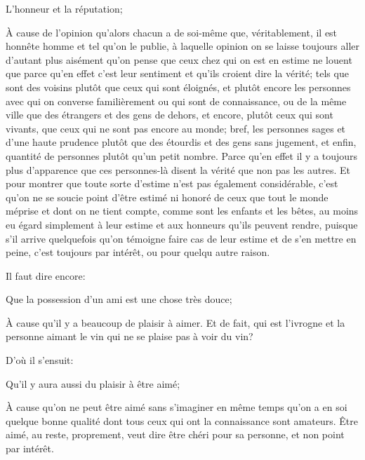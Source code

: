 \begin{lieu}
	L'honneur et la réputation;
\end{lieu}

À cause de l'opinion qu'alors chacun a de soi-même que, véritablement, il est honnête homme et tel qu'on le
publie, à laquelle opinion on se laisse toujours aller d'autant plus aisément qu'on pense que ceux chez qui
on est en estime ne louent que parce qu'en effet c'est leur sentiment et qu'ils croient dire la vérité; tels
que sont des voisins plutôt que ceux qui sont éloignés, et plutôt encore les personnes avec qui on converse
familièrement ou qui sont de connaissance, ou de la même ville que des étrangers et des gens de dehors, et
encore, plutôt ceux qui sont vivants, que ceux qui ne sont pas encore au monde; bref, les personnes sages et
d'une haute prudence plutôt que des étourdis et des gens sans jugement, et enfin, quantité de personnes
plutôt qu'un petit nombre. Parce qu'en effet il y a toujours plus d'apparence que ces personnes-là disent la
vérité que non pas les autres. Et pour montrer que toute sorte d'estime n'est pas également considérable, c'est
qu'on ne se soucie point d'être estimé ni honoré de ceux que tout le monde méprise et dont on ne tient compte,
comme sont les enfants et les bêtes, au moins eu égard simplement à leur estime et aux honneurs qu'ils peuvent
rendre, puisque s'il arrive quelquefois qu'on témoigne faire cas de leur estime et de s'en mettre en peine,
c'est toujours par intérêt, ou pour quelqu autre raison.

\bigbreak

Il faut dire encore:

\begin{lieu}
	Que la possession d'un ami est une chose très douce;
\end{lieu}

À cause qu'il y a beaucoup de plaisir à aimer. Et de fait, qui est l'ivrogne et la personne aimant le vin qui
ne se plaise pas à voir du vin?

D'où il s'ensuit:

\begin{lieu}
	Qu'il y aura aussi du plaisir à être aimé;
\end{lieu}

À cause qu'on ne peut être aimé sans s'imaginer en même temps qu'on a en soi quelque bonne qualité dont tous
ceux qui ont la connaissance sont amateurs. Être aimé, au reste, proprement, veut dire être chéri pour sa
personne, et non point par intérêt.

